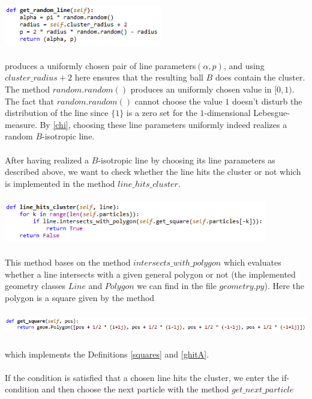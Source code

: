 \documentclass[12pt,a4paper]{scrartcl}
\newcommand{\1}{\mathbbm{1}}
\theoremstyle{definition}
\numberwithin{equation}{section}
\begin{document}
\\
\includegraphics[height=1.8cm]{images/code-snippets/randomline.png} \\
\\
produces a uniformly chosen pair of line parameters$(\alpha,p)$, and using $\mathit{cluster\_radius + 2}$ here ensures that the resulting ball $B$ does contain the cluster. The method $\mathit{random.random()}$ produces an uniformly chosen value in $[0,1)$. The fact that $\mathit{random.random()}$ cannot choose the value $1$ doesn't disturb the distribution of the line since $\{1\}$ is a zero set for the $1$-dimensional Lebesgue-measure. By \ref{chi}, choosing these line parameters uniformly indeed realizes a random $B$-isotropic line. \\
\\After having realized a $B$-isotropic line by choosing its line parameters as described above, we want to check whether the line hits the cluster or not which is implemented in the method $\mathit{line\_hits\_cluster}$. \\
\\
\includegraphics[height=1.8cm]{images/code-snippets/linehitscluster.png} \\
\\
This method bases on the method $\mathit{intersects\_with\_polygon}$ which evaluates whether a line intersects with a given general polygon or not (the implemented geometry classes $\mathit{Line}$ and $\mathit{Polygon}$ we can find in the file $\mathit{geometry.py}$). Here the polygon is a square given by the method \\
\\
\includegraphics[height=0.8cm]{images/code-snippets/getsquare.png} \\
\\
which implements the Definitions \ref{squares} and \ref{ghitA}. \\
\\If the condition is satisfied that a chosen line hits the cluster, we enter the if-condition and then choose the next particle with the method $\mathit{get\_next\_particle}$\\
\end{document}
